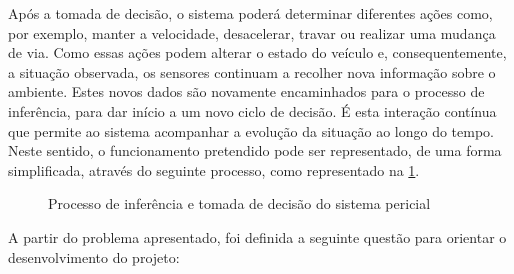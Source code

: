 Após a tomada de decisão, o sistema poderá determinar diferentes ações como,
por exemplo, manter a velocidade, desacelerar, travar ou realizar uma mudança
de via. Como essas ações podem alterar o estado do veículo e,
consequentemente, a situação observada, os sensores continuam a recolher nova
informação sobre o ambiente. Estes novos dados são novamente encaminhados
para o processo de inferência, para dar início a um novo ciclo de decisão. É
esta interação contínua que permite ao sistema acompanhar a evolução da
situação ao longo do tempo. Neste sentido, o funcionamento pretendido pode
ser representado, de uma forma simplificada, através do seguinte processo,
como representado na \cref{fig:ciclo-decisao}.

\begin{figure}[H]
  \centering
  \caption{Processo de inferência e tomada de decisão do sistema pericial}
  \label{fig:ciclo-decisao}
\end{figure}

A partir do problema apresentado, foi definida a seguinte questão para
orientar o desenvolvimento do projeto:

